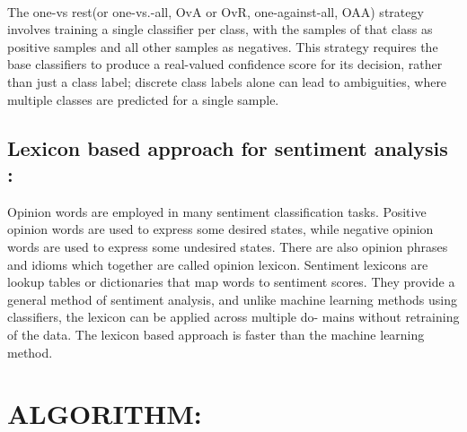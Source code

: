  \paragraph{}
 The one-vs rest(or one-vs.-all, OvA or OvR, one-against-all, OAA) strategy involves training a single classifier per class, with the samples of that class as positive samples and all other samples as negatives. This strategy requires the base classifiers to produce a real-valued confidence score for its decision, rather than just a class label; discrete class labels alone can lead to ambiguities, where multiple classes are predicted for a single sample.
 \paragraph{}
 
\subsection{Lexicon based approach for sentiment analysis :}
\indent
Opinion words are employed in many sentiment classification tasks. Positive opinion
words are used to express some desired states, while negative opinion words are used
to express some undesired states. There are also opinion phrases and idioms which
together are called opinion lexicon. 
Sentiment lexicons are lookup tables or dictionaries that map words to sentiment
scores. They provide a general method of sentiment analysis, and unlike machine
learning methods using classifiers, the lexicon can be applied across multiple do-
mains without retraining of the data. The lexicon based approach is faster than
the machine learning method.



\section{ALGORITHM:}
